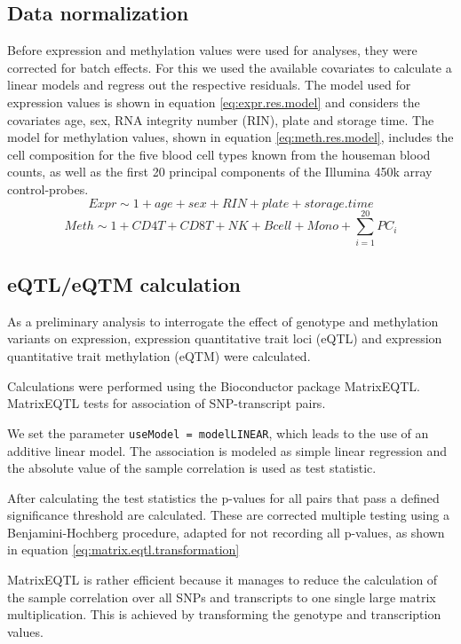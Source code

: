 \documentclass[a4paper,12pt]{article}
\begin{document}
\subsection{Data normalization}
Before expression and methylation values were used for analyses, they were corrected for batch effects. For this we used the available covariates to calculate a linear models and regress out the respective residuals. The model used for expression values is shown in equation \ref{eq:expr.res.model} and considers the covariates age, sex, RNA integrity number (RIN), plate and storage time. The model for methylation values, shown in equation \ref{eq:meth.res.model},
includes the cell composition for the five blood cell types known from the houseman blood counts, as well as the first 20 principal components of the Illumina 450k array control-probes. 
\begin{equation}
\label{eq:expr.res.model}
Expr \sim 1+age+sex+RIN+plate+storage.time
\end{equation}
\begin{equation}
\label{eq:meth.res.model}
Meth \sim 1+CD4T+CD8T+NK+Bcell+Mono+\sum_{i=1}^{20} PC_{i}
\end{equation}


\subsection{eQTL/eQTM calculation}
As a preliminary analysis to interrogate the effect of genotype and methylation variants on expression, expression quantitative trait loci (eQTL) and expression quantitative trait methylation (eQTM) were calculated.

Calculations were performed using the Bioconductor package MatrixEQTL\cite{10.1093/bioinformatics/bts163}. MatrixEQTL tests for association of SNP-transcript pairs.  

We set the parameter \texttt{useModel = modelLINEAR}, which leads to the use of an  additive linear model. The association is modeled as simple linear regression and the absolute value of the sample correlation is used as test statistic.

After calculating the test statistics the p-values for all pairs that pass a defined significance threshold are calculated. These are corrected multiple testing using a Benjamini-Hochberg procedure\cite{10.2307/2346101}, adapted for not recording all p-values, as shown in equation \ref{eq:matrix.eqtl.transformation}

MatrixEQTL is rather efficient because it manages to reduce the calculation of the sample correlation over all SNPs and transcripts to one single large matrix multiplication. This is achieved by transforming the genotype and transcription values. 
\end{document}
